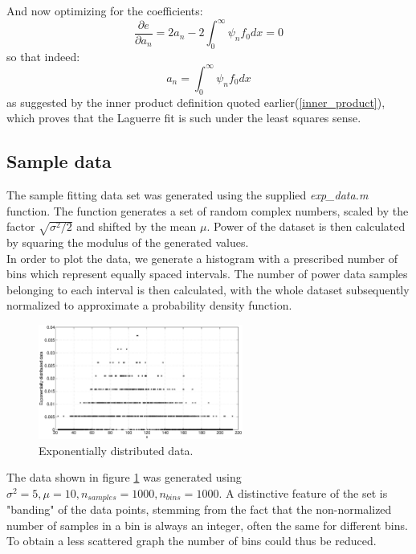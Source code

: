 \documentclass[a4paper]{article}
\numberwithin{equation}{section}
\begin{document}
\noindent And now optimizing for the coefficients:
\begin{equation}
\frac{\partial e}{\partial a_n} = 2a_n - 2 \int_{0}^{\infty} \psi_nf_0dx = 0
\end{equation}
so that indeed:
\begin{equation}
a_n = \int_{0}^{\infty} \psi_nf_0dx
\end{equation}
as suggested by the inner product definition quoted earlier(\ref{inner_product}), which proves that the Laguerre fit is such under the least squares sense.

\subsection{Sample data}
The sample fitting data set was generated using the supplied \textit{exp\_data.m} function.
The function generates a set of random complex numbers, scaled by the factor $\sqrt{\sigma^2/2}$ and shifted by the mean $\mu$. Power of the dataset is then calculated by squaring the modulus of the generated values. \\
In order to plot the data, we generate a histogram with a prescribed number of bins which represent equally spaced intervals. The number of power data samples belonging to each interval is then calculated, with the whole dataset subsequently normalized to approximate a probability density function.

\begin{figure}
\centering
\includegraphics[width=0.6\textwidth]{exp_data.eps}
\caption{\label{fig:expdata}Exponentially distributed data.}
\end{figure}

\noindent The data shown in figure \ref{fig:expdata} was generated using $\sigma^2=5, \mu=10, n_{samples} = 1000, n_{bins} = 1000$. A distinctive feature of the set is "banding" of the data points, stemming from the fact that the non-normalized number of samples in a bin is always an integer, often the same for different bins. To obtain a less scattered graph the number of bins could thus be reduced.
\end{document}
